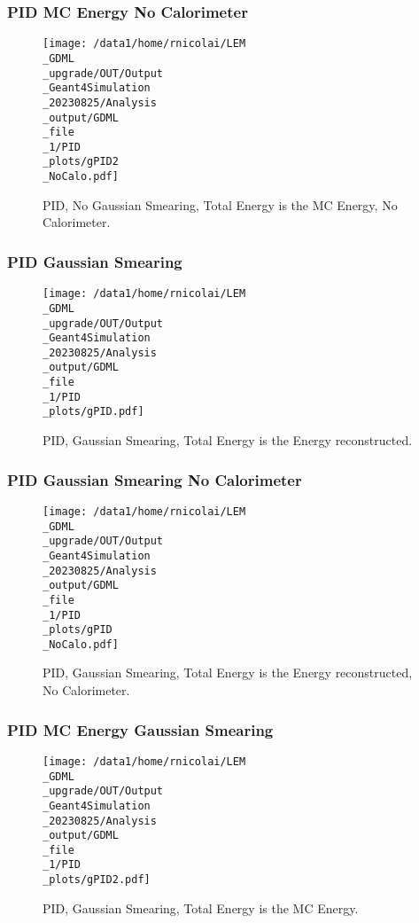 \documentclass[8pt]{beamer}
\begin{document}
            \begin{frame}
                \frametitle{PID MC Energy No Calorimeter}
            
        \begin{figure}[h]
            \centering
            \texttt{[image: /data1/home/rnicolai/LEM\\\_GDML\\\_upgrade/OUT/Output\\\_Geant4Simulation\\\_20230825/Analysis\\\_output/GDML\\\_file\\\_1/PID\\\_plots/gPID2\\\_NoCalo.pdf]}
            \caption{PID, No Gaussian Smearing, Total Energy is the MC Energy, No Calorimeter.}
        \end{figure}
        
            \end{frame}
            
            \begin{frame}
                \frametitle{PID Gaussian Smearing}
            
        \begin{figure}[h]
            \centering
            \texttt{[image: /data1/home/rnicolai/LEM\\\_GDML\\\_upgrade/OUT/Output\\\_Geant4Simulation\\\_20230825/Analysis\\\_output/GDML\\\_file\\\_1/PID\\\_plots/gPID.pdf]}
            \caption{PID, Gaussian Smearing, Total Energy is the Energy reconstructed.}
        \end{figure}
        
            \end{frame}
            
            \begin{frame}
                \frametitle{PID Gaussian Smearing No Calorimeter}
            
        \begin{figure}[h]
            \centering
            \texttt{[image: /data1/home/rnicolai/LEM\\\_GDML\\\_upgrade/OUT/Output\\\_Geant4Simulation\\\_20230825/Analysis\\\_output/GDML\\\_file\\\_1/PID\\\_plots/gPID\\\_NoCalo.pdf]}
            \caption{PID, Gaussian Smearing, Total Energy is the Energy reconstructed, No Calorimeter.}
        \end{figure}
        
            \end{frame}
            
            \begin{frame}
                \frametitle{PID MC Energy Gaussian Smearing}
            
        \begin{figure}[h]
            \centering
            \texttt{[image: /data1/home/rnicolai/LEM\\\_GDML\\\_upgrade/OUT/Output\\\_Geant4Simulation\\\_20230825/Analysis\\\_output/GDML\\\_file\\\_1/PID\\\_plots/gPID2.pdf]}
            \caption{PID, Gaussian Smearing, Total Energy is the MC Energy.}
        \end{figure}
        
            \end{frame}
            
\end{document}
